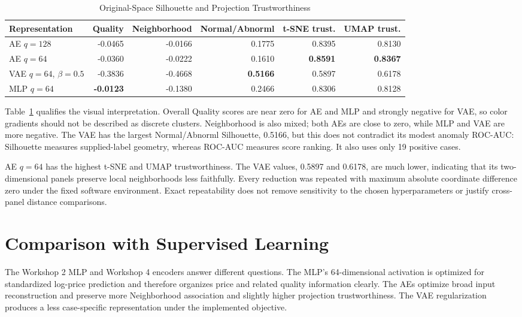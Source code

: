 \documentclass[11pt,letterpaper]{article}
\newcommand{\metricbest}[1]{\textbf{#1}}
\begin{document}
\begin{table}[htbp]
\caption{Original-Space Silhouette and Projection Trustworthiness}
\label{tab:latent}
\centering
\small
\begin{tabular}{lrrrrr}
\toprule
Representation & Quality & Neighborhood & Normal/Abnorml & t-SNE trust. & UMAP trust. \\
\midrule
AE $q=128$ & -0.0465 & -0.0166 & 0.1775 & 0.8395 & 0.8130 \\
AE $q=64$ & -0.0360 & -0.0222 & 0.1610 & \metricbest{0.8591} & \metricbest{0.8367} \\
VAE $q=64$, $\beta=0.5$ & -0.3836 & -0.4668 & \metricbest{0.5166} & 0.5897 & 0.6178 \\
MLP $q=64$ & \metricbest{-0.0123} & -0.1380 & 0.2466 & 0.8306 & 0.8128 \\
\bottomrule
\end{tabular}
\end{table}

Table~\ref{tab:latent} qualifies the visual interpretation. Overall Quality scores are near zero for AE and MLP and strongly negative for VAE, so color gradients should not be described as discrete clusters. Neighborhood is also mixed; both AEs are close to zero, while MLP and VAE are more negative. The VAE has the largest Normal/Abnorml Silhouette, 0.5166, but this does not contradict its modest anomaly ROC-AUC: Silhouette measures supplied-label geometry, whereas ROC-AUC measures score ranking. It also uses only 19 positive cases.

AE $q=64$ has the highest t-SNE and UMAP trustworthiness. The VAE values, 0.5897 and 0.6178, are much lower, indicating that its two-dimensional panels preserve local neighborhoods less faithfully. Every reduction was repeated with maximum absolute coordinate difference zero under the fixed software environment. Exact repeatability does not remove sensitivity to the chosen hyperparameters or justify cross-panel distance comparisons.

\section{Comparison with Supervised Learning}
The Workshop 2 MLP and Workshop 4 encoders answer different questions. The MLP's 64-dimensional activation is optimized for standardized log-price prediction and therefore organizes price and related quality information clearly. The AEs optimize broad input reconstruction and preserve more Neighborhood association and slightly higher projection trustworthiness. The VAE regularization produces a less case-specific representation under the implemented objective.
\end{document}
